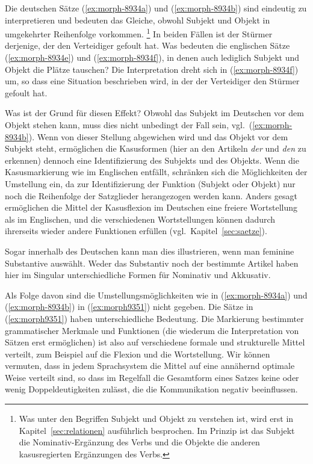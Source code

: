 Die deutschen Sätze (\ref{ex:morph-8934a}) und (\ref{ex:morph-8934b}) sind eindeutig zu interpretieren und bedeuten das Gleiche, obwohl Subjekt und Objekt in umgekehrter Reihenfolge vorkommen.%
\footnote{Was unter den Begriffen Subjekt und Objekt zu verstehen ist, wird erst in Kapitel~\ref{sec:relationen} ausführlich besprochen.
Im Prinzip ist das Subjekt die Nominativ-Ergänzung des Verbs und die Objekte die anderen kasusregierten Ergänzungen des Verbs.}
In beiden Fällen ist der Stürmer derjenige, der den Verteidiger gefoult hat.
Was bedeuten die englischen Sätze (\ref{ex:morph-8934e}) und (\ref{ex:morph-8934f}), in denen auch lediglich Subjekt und Objekt die Plätze tauschen?
Die Interpretation dreht sich in (\ref{ex:morph-8934f}) um, so dass eine Situation beschrieben wird, in der der Verteidiger den Stürmer gefoult hat.

Was ist der Grund für diesen Effekt?
Obwohl das Subjekt im Deutschen vor dem Objekt stehen kann, muss dies nicht unbedingt der Fall sein, vgl.\ (\ref{ex:morph-8934b}).
Wenn von dieser Stellung abgewichen wird und das Objekt vor dem Subjekt steht, ermöglichen die Kasusformen (hier an den Artikeln \textit{der} und \textit{den} zu erkennen) dennoch eine Identifizierung des Subjekts und des Objekts.
Wenn die Kasusmarkierung wie im Englischen entfällt, schränken sich die Möglichkeiten der Umstellung ein, da zur Identifizierung der Funktion (Subjekt oder Objekt) nur noch die Reihenfolge der Satzglieder herangezogen werden kann.
Anders gesagt ermöglichen die Mittel der Kasusflexion im Deutschen eine freiere Wortstellung als im Englischen, und die verschiedenen Wortstellungen können dadurch ihrerseits wieder andere Funktionen erfüllen (vgl.\ Kapitel~\ref{sec:saetze}).

Sogar innerhalb des Deutschen kann man dies illustrieren, wenn man \zB feminine Substantive auswählt.
Weder das Substantiv noch der bestimmte Artikel haben hier im Singular unterschiedliche Formen für Nominativ und Akkusativ.

\begin{exe}
  \ex \label{ex:morph9351}
  \begin{xlist}
  \end{xlist}
\end{exe}

Als Folge davon sind die Umstellungsmöglichkeiten wie in (\ref{ex:morph-8934a}) und (\ref{ex:morph-8934b}) in (\ref{ex:morph9351}) nicht gegeben.
Die Sätze in (\ref{ex:morph9351}) haben unterschiedliche Bedeutung.
Die Markierung bestimmter grammatischer Merkmale und Funktionen (die wiederum die Interpretation von Sätzen erst ermöglichen) ist also auf verschiedene formale und strukturelle Mittel verteilt, zum Beispiel auf die Flexion und die Wortstellung.
Wir können vermuten, dass in jedem Sprachsystem die Mittel auf eine annähernd optimale Weise verteilt sind, so dass im Regelfall die Gesamtform eines Satzes keine oder wenig Doppeldeutigkeiten zulässt, die die Kommunikation negativ beeinflussen.

